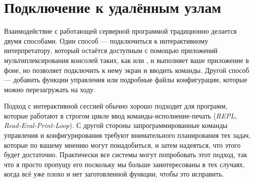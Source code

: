 \chapter{Подключение к удалённым узлам}
\label{chap:connecting}

Взаимодействие с работающей серверной программой традиционно делается двумя способами. Один способ --- подключиться к интерактивному интерпретатору, который остаётся доступным с помощью приложений мультиплексирования консолей таких, как  или , и выполняет ваше приложение в фоне, но позволяет подключить к нему экран и вводить команды. Другой способ --- добавить функции управления или подробные файлы конфигурации, которые можно перезагружать на ходу.

Подход с интерактивной сессией обычно хорошо подходит для программ, которые работают в строгом цикле ввод команды-исполнение-печать (\emph{REPL, Read-Eval-Print-Loop}). С другой стороны запрограммированные команды управления и конфигурирования требуют внимательного планирования тех задач, которые по вашему мнению могут понадобиться, и затем надеяться, что этого будет достаточно. Практически все системы могут попробовать этот подход, так что я просто пропущу его поскольку мы больше заинтересованы в тех случаях, когда всё уже плохо и нет заготовленной функции, чтобы это исправить.

